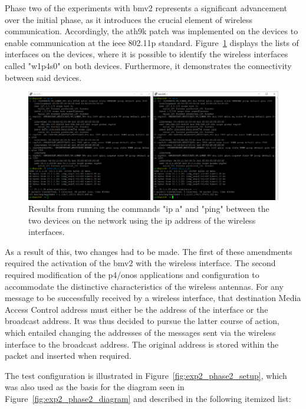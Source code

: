 Phase two of the experiments with \gls{bmv2} represents a significant advancement over the initial phase, as it introduces the crucial element of wireless communication. Accordingly, the ath9k patch was implemented on the devices to enable communication at the \gls{ieee} 802.11p standard. Figure~\ref{fig:exp2_phase2_wireless} displays the lists of interfaces on the devices, where it is possible to identify the wireless interfaces called "w1p4s0" on both devices. Furthermore, it demonstrates the connectivity between said devices.

\begin{figure}
	\centering
	\includegraphics[width=\textwidth]{Chapters/Figures/tests/bmv2_phase_2/wireless_config_&_connectivity.PNG}
	\caption{Results from running the commands "ip a" and "ping" between the two devices on the network using the \gls{ip} address of the wireless interfaces.}
	\label{fig:exp2_phase2_wireless}
\end{figure}

As a result of this, two changes had to be made. The first of these amendments required the activation of the \gls{bmv2} with the wireless interface. The second required modification of the \gls{p4}/\gls{onos} applications and configuration to accommodate the distinctive characteristics of the wireless antennas. For any message to be successfully received by a wireless interface, that destination Media Access Control address must either be the address of the interface or the broadcast address. It was thus decided to pursue the latter course of action, which entailed changing the addresses of the messages sent via the wireless interface to the broadcast address. The original address is stored within the packet and inserted when required.

The test configuration is illustrated in Figure~\ref{fig:exp2_phase2_setup}, which was also used as the basis for the diagram seen in Figure~\ref{fig:exp2_phase2_diagram} and described in the following itemized list:

